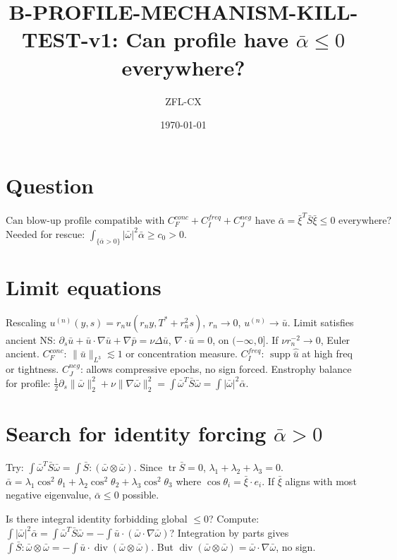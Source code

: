 \documentclass[11pt]{article}
\begin{document}
\title{B-PROFILE-MECHANISM-KILL-TEST-v1: Can profile have $\bar\alpha\le0$ everywhere?}
\author{ZFL-CX}\date{\today}\maketitle

\section{Question}
$\boxed{\text{Can blow-up profile compatible with }C_F^{conc}+C_I^{freq}+C_J^{neg}\text{ have }\bar\alpha=\bar\xi^T\bar S\bar\xi\le0\text{ everywhere?}}$
Needed for rescue: $\boxed{\int_{\{\bar\alpha>0\}}|\bar\omega|^2\bar\alpha\ge c_0>0}$.

\section{Limit equations}
Rescaling $u^{(n)}(y,s)=r_nu(r_ny,T^*+r_n^2s)$, $r_n\to0$, $u^{(n)}\to\bar u$.
Limit satisfies ancient NS: $\partial_s\bar u+\bar u\cdot\nabla\bar u+\nabla\bar p=\nu\Delta\bar u$, $\nabla\cdot\bar u=0$, on $(-\infty,0]$.
If $\nu r_n^{-2}\to0$, Euler ancient.
$C_F^{conc}$: $\|\bar u\|_{L^3}\lesssim1$ or concentration measure.
$C_I^{freq}$: $\operatorname{supp}\hat{\bar u}$ at high freq or tightness.
$C_J^{neg}$: allows compressive epochs, no sign forced.
Enstrophy balance for profile: $\frac12\partial_s\|\bar\omega\|_2^2+\nu\|\nabla\bar\omega\|_2^2=\int\bar\omega^T\bar S\bar\omega=\int|\bar\omega|^2\bar\alpha$.

\section{Search for identity forcing $\bar\alpha>0$}
Try: $\int\bar\omega^T\bar S\bar\omega =\int\bar S:\!(\bar\omega\otimes\bar\omega)$.
Since $\operatorname{tr}\bar S=0$, $\lambda_1+\lambda_2+\lambda_3=0$.
$\bar\alpha=\lambda_1\cos^2\theta_1+\lambda_2\cos^2\theta_2+\lambda_3\cos^2\theta_3$ where $\cos\theta_i=\bar\xi\cdot e_i$.
If $\bar\xi$ aligns with most negative eigenvalue, $\bar\alpha\le0$ possible.

Is there integral identity forbidding global $\le0$?
Compute: $\int|\bar\omega|^2\bar\alpha =\int\bar\omega^T\bar S\bar\omega = -\int\bar u\cdot(\bar\omega\cdot\nabla\bar\omega)$? Integration by parts gives $\int\bar S:\bar\omega\otimes\bar\omega=-\int\bar u\cdot\operatorname{div}(\bar\omega\otimes\bar\omega)$.
But $\operatorname{div}(\bar\omega\otimes\bar\omega)=\bar\omega\cdot\nabla\bar\omega$, no sign.
\end{document}
